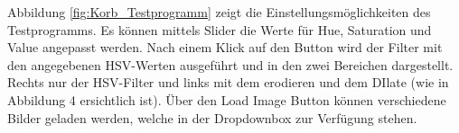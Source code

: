 Abbildung \ref{fig:Korb_Testprogramm} zeigt die Einstellungsmöglichkeiten des Testprogramms. Es können mittels Slider die Werte für Hue, Saturation und Value angepasst werden. Nach einem Klick auf den Button wird der Filter mit den angegebenen HSV-Werten ausgeführt und in den zwei Bereichen dargestellt. Rechts nur der HSV-Filter und links mit dem erodieren und dem DIlate (wie in Abbildung 4 ersichtlich ist).
Über den Load Image Button können verschiedene Bilder geladen werden, welche in der Dropdownbox zur Verfügung stehen.
